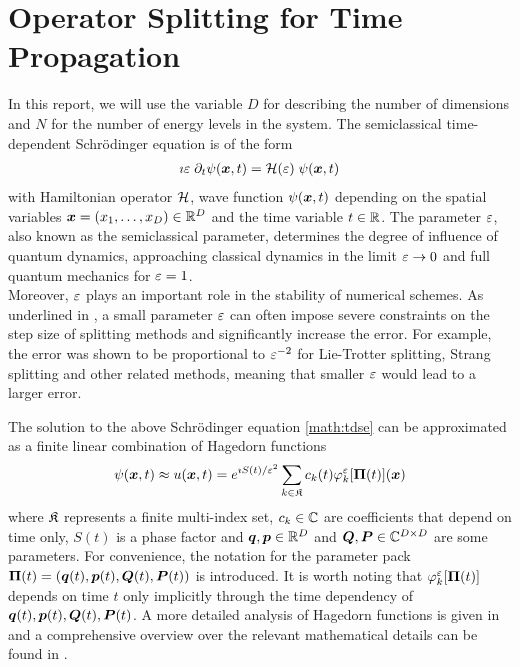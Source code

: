 \section{Operator Splitting for Time Propagation}
\label{sec:operatorsplitting}
%
In this report, we will use the variable $D$ for describing the number of dimensions and $N$ for the number of energy levels in the system.
The semiclassical time-dependent Schrödinger equation is of the form
%
\begin{align}
	\label{math:tdse}
	\imath \varepsilon \; \partial_t \psi (\bm{x},t) = \mathcal{H} (\varepsilon) \; \psi (\bm{x},t)
\end{align}
%
with Hamiltonian operator $\mathcal{H}$, wave function $\psi(\bm{x},t)$ depending on the spatial variables $\bm{x} = (x_1,\dots,x_D) \in \mathbb{R}^D$ and the time variable $t \in \mathbb{R}$.
The parameter $\varepsilon$, also known as the semiclassical parameter, determines the degree of influence of quantum dynamics, approaching classical dynamics in the limit $\varepsilon \rightarrow 0$ and full quantum mechanics for $\varepsilon = 1$. \\
Moreover, $\varepsilon$ plays an important role in the stability of numerical schemes.
As underlined in \cite{GH_convsemiclassical}, a small parameter $\varepsilon$ can often impose severe constraints on the step size of splitting methods and significantly increase the error. For example, the error was shown to be proportional to $\varepsilon^{-2}$ for Lie-Trotter splitting, Strang splitting and other related methods, meaning that smaller $\varepsilon$ would lead to a larger error.
\par\medskip
%
The solution to the above Schrödinger equation \ref{math:tdse} can be approximated as a finite linear combination of Hagedorn functions 
\begin{align}
	\label{math:hagedornwp}
	\psi(\bm{x},t) \approx u(\bm{x},t)
	= e^{\imath S(t)/\varepsilon^2} \sum_{k \in \mathfrak{K}} c_k(t) \varphi_k^{\varepsilon} [ \bm{\Pi} (t) ] (\bm{x})
\end{align}
where $\mathfrak{K}$ represents a finite multi-index set, $c_k \in \mathbb{C}$ are coefficients that depend on time only, $S(t)$ is a phase factor and $\bm{q},\bm{p} \in \mathbb{R}^D$ and $\bm{Q},\bm{P} \in \mathbb{C}^{D \times D}$ are some parameters.
For convenience, the notation for the parameter pack $\bm{\Pi} (t) = (\bm{q}(t),\bm{p}(t),\bm{Q}(t),\bm{P}(t))$ is introduced.
It is worth noting that $\varphi_k^{\varepsilon} [ \bm{\Pi} (t) ]$ depends on time $t$ only implicitly through the time dependency of $\bm{q}(t),\bm{p}(t),\bm{Q}(t),\bm{P}(t)$.
A more detailed analysis of Hagedorn functions is given in \cite{FGL_semiclassical_dynamics} and a comprehensive overview over the relevant mathematical details can be found in \cite{B_master_thesis}.

